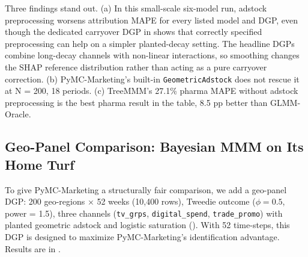 \documentclass[review,12pt]{elsarticle}
\begin{document}
Three findings stand out. (a) In this small-scale six-model run, adstock
preprocessing worsens attribution MAPE for every listed model and DGP, even
though the dedicated carryover DGP in  shows that correctly
specified preprocessing can help on a simpler planted-decay setting. The
headline DGPs combine long-decay channels with non-linear interactions, so
smoothing changes the SHAP reference distribution rather than acting as a pure
carryover correction. (b) PyMC-Marketing's built-in
\texttt{GeometricAdstock} does not rescue it at N = 200, 18 periods.
(c) TreeMMM's 27.1\% pharma MAPE without adstock preprocessing is the best
pharma result in the table, 8.5 pp better than GLMM-Oracle.

\subsection{Geo-Panel Comparison: Bayesian MMM on Its Home Turf}
\label{sec:results:geo}

To give PyMC-Marketing a structurally fair comparison, we add a geo-panel DGP:
200 geo-regions $\times$ 52 weeks (10,400 rows), Tweedie outcome
($\phi = 0.5$, power = 1.5), three channels (\texttt{tv\_grps},
\texttt{digital\_spend}, \texttt{trade\_promo}) with planted geometric adstock
and logistic saturation (). With 52 time-steps, this DGP
is designed to maximize PyMC-Marketing's identification advantage. Results are
in .

\begin{table}[ht]
\centering
\caption{Geo-panel DGP channel specifications.}
\label{tab:geo_dgp}
\end{table}
\end{document}
